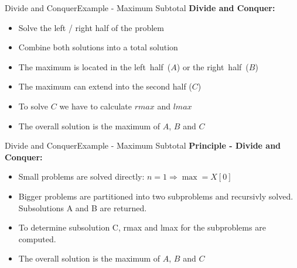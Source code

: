 \begin{frame}{Divide and Conquer}{Example - Maximum Subtotal}
  \textbf{Divide and Conquer:}
  \vspace{-0.5em}
  \begin{figure}
    \begin{adjustbox}{width=\linewidth}
      
    \end{adjustbox}
    \label{fig:divide_and_conquer:max_sub_total_divide}
  \end{figure}
   \vspace{-0.5em}
  \begin{itemize}
  \item<2->
    Solve the left / right half of the problem
  \item<3->
    Combine both solutions into a total solution
  \item<4->
    The maximum is located in the {\color{Mittel-Blau}left~half~($A$)}
    or the {\color{Mittel-Blau}right~half~($B$)}
  \item<5->
    The maximum can {\color{Mittel-Blau}extend into the second half ($C$)}
  \item<6->
    To solve $C$ we have to calculate $rmax$ and $lmax$
  \item<7->
    The overall solution is the {\color{Mittel-Blau}maximum of $A$, $B$ and $C$}
  \end{itemize}
\end{frame}


\begin{frame}{Divide and Conquer}{Example - Maximum Subtotal}
  \textbf{Principle - Divide and Conquer:}
  \begin{itemize}
    \item<2->
      Small problems are solved directly: {\color{Mittel-Blau}$n = 1 \Rightarrow \max = X[0]$}
    \item<3->
      Bigger problems are partitioned into two subproblems and recursivly solved. Subsolutions A and B
      are returned.
    \item<4>
      To determine subsolution C, rmax and lmax for the subproblems are computed.
    \item<5>
      The overall solution is the {\color{Mittel-Blau}maximum of $A$, $B$ and $C$}
  \end{itemize}
\end{frame}




